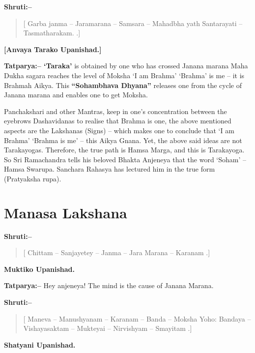 \textbf{Shruti:–}

\begin{verse}
[ Garba janma – Jaramarana – Samsara – Mahadbha yath  Santarayati – Tasmatharakam. .]
\end{verse}

\begin{flushright}
\textbf{[Anvaya Tarako Upanishad.]}
\end{flushright}

\textbf{Tatparya:– ‘Taraka’} is obtained by one who has crossed Janana marana Maha Dukha sagara reaches the level of Moksha ‘I am Brahma’ ‘Brahma’ is me – it is Brahmah Aikya. This \textbf{“Sohambhava Dhyana”} releases one from the cycle of Janana marana and enables one to get Moksha.

Panchakshari and other Mantras, keep in one's concentration between the eyebrows Dashavidanas to realise that Brahma is one, the above mentioned aspects are the Lakshanas (Signs) – which makes one to conclude that ‘I am Brahma’ ‘Brahma is me’ – this Aikya Gnana. Yet, the above said ideas are not Tarakayogas. Therefore, the true path is Hamsa Marga, and this is Tarakayoga. So Sri Ramachandra tells his beloved Bhakta Anjeneya that the word ‘Soham’ – Hamsa Swarupa. Sanchara Rahasya has lectured him in the true form (Pratyaksha rupa).

\chapter{Manasa Lakshana}

\textbf{Shruti:–}

\begin{verse}
[ Chittam – Sanjayetey – Janma – Jara Marana – Karanam .]
\end{verse}

\begin{flushright}
\textbf{Muktiko Upanishad.}
\end{flushright}

\textbf{Tatparya:–} Hey anjeneya! The mind is the cause of Janana Marana.

\textbf{Shruti:–}

\begin{verse}
[ Maneva – Manushyanam – Karanam – Banda – Moksha Yoho:  Bandaya – Vishayasaktam – Mukteyai – Nirvishyam – Smayitam .]
\end{verse}

\begin{flushright}
\textbf{Shatyani Upanishad.}
\end{flushright}

